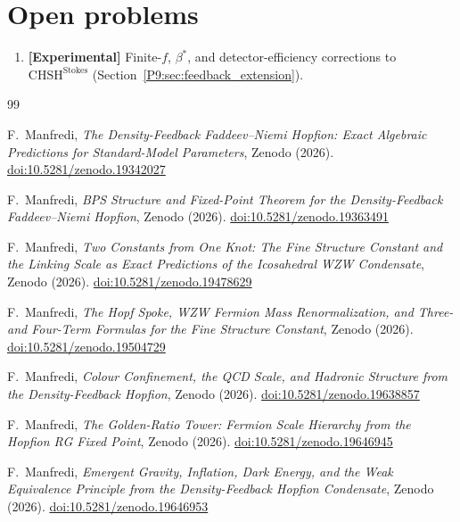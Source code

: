 \documentclass[11pt,a4paper]{article}
\theoremstyle{definition}
\theoremstyle{remark}
\newcommand{\CHSH}{\mathrm{CHSH}}
\begin{document}
\section{Open problems}
\label{P9:sec:open_remaining}
 
\begin{enumerate}[noitemsep]
\item \textbf{[Experimental]} Finite-$f$, $\beta^*$, and detector-efficiency corrections
  to $\CHSH^\mathrm{Stokes}$ (Section~\ref{P9:sec:feedback_extension}).
\end{enumerate}
 

\begin{thebibliography}{99}
 
F.~Manfredi,
\textit{The Density-Feedback Faddeev--Niemi Hopfion:
  Exact Algebraic Predictions for Standard-Model Parameters},
Zenodo (2026).
\href{https://doi.org/10.5281/zenodo.19342027}{doi:10.5281/zenodo.19342027}
 
F.~Manfredi,
\textit{BPS Structure and Fixed-Point Theorem for the
  Density-Feedback Faddeev--Niemi Hopfion},
Zenodo (2026).
\href{https://doi.org/10.5281/zenodo.19363491}{doi:10.5281/zenodo.19363491}
 
F.~Manfredi,
\textit{Two Constants from One Knot: The Fine Structure Constant and
  the Linking Scale as Exact Predictions of the Icosahedral WZW Condensate},
Zenodo (2026).
\href{https://doi.org/10.5281/zenodo.19478629}{doi:10.5281/zenodo.19478629}
 
F.~Manfredi,
\textit{The Hopf Spoke, WZW Fermion Mass Renormalization,
  and Three- and Four-Term Formulas for the Fine Structure Constant},
Zenodo (2026).
\href{https://doi.org/10.5281/zenodo.19504729}{doi:10.5281/zenodo.19504729}
 
F.~Manfredi,
\textit{Colour Confinement, the QCD Scale, and Hadronic Structure
  from the Density-Feedback Hopfion},
Zenodo (2026).
\href{https://doi.org/10.5281/zenodo.19638857}{doi:10.5281/zenodo.19638857}
 
F.~Manfredi,
\textit{The Golden-Ratio Tower: Fermion Scale Hierarchy from the Hopfion RG Fixed Point},
Zenodo (2026).
\href{https://doi.org/10.5281/zenodo.19646945}{doi:10.5281/zenodo.19646945}
 
F.~Manfredi,
\textit{Emergent Gravity, Inflation, Dark Energy, and the Weak
  Equivalence Principle from the Density-Feedback Hopfion Condensate},
Zenodo (2026).
\href{https://doi.org/10.5281/zenodo.19646953}{doi:10.5281/zenodo.19646953}
 

\end{thebibliography}
\end{document}
